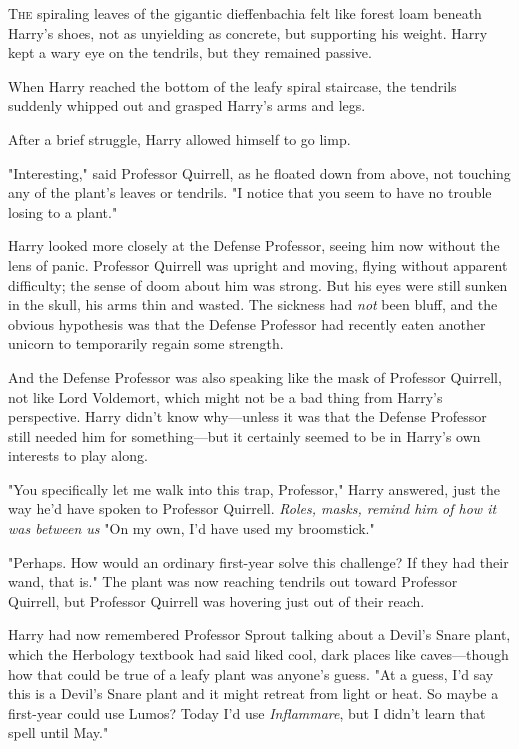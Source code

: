 
\lettrine{T}{he} spiraling
leaves of the gigantic dieffenbachia felt like forest loam beneath Harry's
shoes, not as unyielding as concrete, but supporting his weight. Harry kept a
wary eye on the tendrils, but they remained passive.

When Harry reached the bottom of the leafy spiral staircase, the tendrils
suddenly whipped out and grasped Harry's arms and legs.

After a brief struggle, Harry allowed himself to go limp.

"Interesting," said Professor Quirrell, as he floated down from above, not
touching any of the plant's leaves or tendrils. "I notice that you seem to have
no trouble losing to a plant."

Harry looked more closely at the Defense Professor, seeing him now without the
lens of panic. Professor Quirrell was upright and moving, flying without
apparent difficulty; the sense of doom about him was strong. But his eyes were
still sunken in the skull, his arms thin and wasted. The sickness had
\emph{not} been bluff, and the obvious hypothesis was that the Defense
Professor had recently eaten another unicorn to temporarily regain some
strength.

And the Defense Professor was also speaking like the mask of Professor
Quirrell, not like Lord Voldemort, which might not be a bad thing from Harry's
perspective. Harry didn't know why---unless it was that the Defense Professor
still needed him for something---but it certainly seemed to be in Harry's own
interests to play along.

"You specifically let me walk into this trap, Professor," Harry answered, just
the way he'd have spoken to Professor Quirrell. \emph{Roles, masks, remind him
of how it was between us{\el}} "On my own, I'd have used my broomstick."

"Perhaps. How would an ordinary first-year solve this challenge? If they had
their wand, that is." The plant was now reaching tendrils out toward Professor
Quirrell, but Professor Quirrell was hovering just out of their reach.

Harry had now remembered Professor Sprout talking about a Devil's Snare plant,
which the Herbology textbook had said liked cool, dark places like
caves---though how that could be true of a leafy plant was anyone's guess. "At
a guess, I'd say this is a Devil's Snare plant and it might retreat from light
or heat. So maybe a first-year could use Lumos? Today I'd use
\emph{Inflammare}, but I didn't learn that spell until May."

